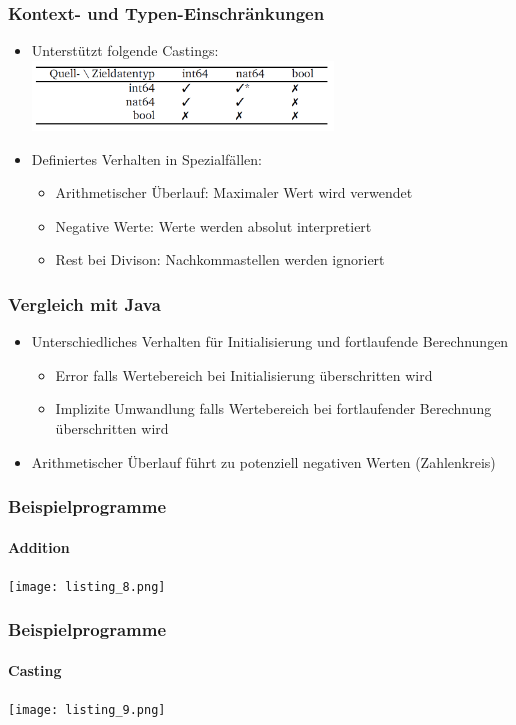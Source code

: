 \documentclass{beamer}
\begin{document}
    \begin{frame}
        \frametitle{Kontext- und Typen-Einschränkungen}
        \begin{itemize}
            \item Unterstützt folgende Castings:
            {\includegraphics[width=8cm]{listing_7.png}}
            \item Definiertes Verhalten in Spezialfällen:
            \begin{itemize}
                \item Arithmetischer Überlauf: Maximaler Wert wird verwendet
                \item Negative Werte: Werte werden absolut interpretiert
                \item Rest bei Divison: Nachkommastellen werden ignoriert
            \end{itemize}
        \end{itemize}
        \vspace{30}
    \end{frame}

    \begin{frame}
        \frametitle{Vergleich mit Java}
        \begin{itemize}
            \item Unterschiedliches Verhalten für Initialisierung und fortlaufende Berechnungen
            \begin{itemize}
                \item Error falls Wertebereich bei Initialisierung überschritten wird
                \item Implizite Umwandlung falls Wertebereich bei fortlaufender Berechnung überschritten wird
            \end{itemize}
            \item Arithmetischer Überlauf führt zu potenziell negativen Werten (Zahlenkreis)
        \end{itemize}
        \vspace{30}
    \end{frame}

    \begin{frame}
        \frametitle{Beispielprogramme}
        \framesubtitle{Addition}
        {\texttt{[image: listing\_8.png]}}
        \vspace{30}
    \end{frame}

    \begin{frame}
        \frametitle{Beispielprogramme}
        \framesubtitle{Casting}
        {\texttt{[image: listing\_9.png]}}
        \vspace{30}
    \end{frame}
\end{document}
